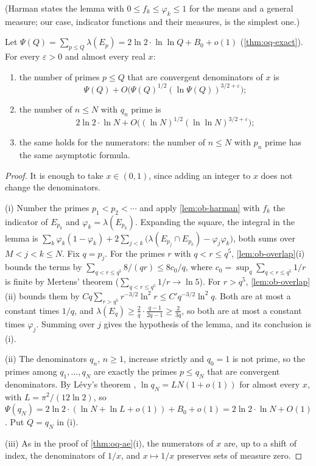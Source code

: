 (Harman states the lemma with $0 \le f_k \le \varphi_k \le 1$ for the means and a general measure; our case, indicator functions and their measures, is the simplest one.)

\begin{theorem}\label{thm:ob-ae}
Let $\Psi(Q) = \sum_{p \le Q}\lambda(E_p) = 2\ln 2\cdot\ln\ln Q + B_0 + o(1)$ (\cref{thm:oq-exact}). For every $\varepsilon > 0$ and almost every real $x$:
\begin{enumerate}[label=(\roman*)]
\item the number of primes $p \le Q$ that are convergent denominators of $x$ is
\[
  \Psi(Q) + O\bigl(\Psi(Q)^{1/2}(\ln\Psi(Q))^{3/2+\varepsilon}\bigr);
\]
\item the number of $n \le N$ with $q_n$ prime is
\[
  2\ln 2\cdot\ln N + O\bigl((\ln N)^{1/2}(\ln\ln N)^{3/2+\varepsilon}\bigr);
\]
\item the same holds for the numerators: the number of $n \le N$ with $p_n$ prime has the same asymptotic formula.
\end{enumerate}
\end{theorem}

\begin{proof}
It is enough to take $x \in (0,1)$, since adding an integer to $x$ does not change the denominators.

(i) Number the primes $p_1 < p_2 < \cdots$ and apply \cref{lem:ob-harman} with $f_k$ the indicator of $E_{p_k}$ and $\varphi_k = \lambda(E_{p_k})$. Expanding the square, the integral in the lemma is $\sum_k \varphi_k(1 - \varphi_k) + 2\sum_{j<k}\bigl(\lambda(E_{p_j}\cap E_{p_k}) - \varphi_j\varphi_k\bigr)$, both sums over $M < j < k \le N$. Fix $q = p_j$. For the primes $r$ with $q < r \le q^5$, \cref{lem:ob-overlap}(i) bounds the terms by $\sum_{q < r \le q^5} 8/(qr) \le 8c_0/q$, where $c_0 = \sup_q \sum_{q < r \le q^5} 1/r$ is finite by Mertens' theorem ($\sum_{q < r \le q^5} 1/r \to \ln 5$). For $r > q^5$, \cref{lem:ob-overlap}(ii) bounds them by $Cq\sum_{r > q^5} r^{-3/2}\ln^2 r \le C'q^{-3/2}\ln^2 q$. Both are at most a constant times $1/q$, and $\lambda(E_q) \ge \frac2q\cdot\frac{q-1}{2q-1} \ge \frac{2}{3q}$, so both are at most a constant times $\varphi_j$. Summing over $j$ gives the hypothesis of the lemma, and its conclusion is (i).

(ii) The denominators $q_n$, $n \ge 1$, increase strictly and $q_0 = 1$ is not prime, so the primes among $q_1, \dots, q_N$ are exactly the primes $p \le q_N$ that are convergent denominators. By Lévy's theorem \citep{Levy1936}, $\ln q_N = LN(1 + o(1))$ for almost every $x$, with $L = \pi^2/(12\ln 2)$, so $\Psi(q_N) = 2\ln 2\cdot(\ln N + \ln L + o(1)) + B_0 + o(1) = 2\ln 2\cdot\ln N + O(1)$. Put $Q = q_N$ in (i).

(iii) As in the proof of \cref{thm:oq-ae}(i), the numerators of $x$ are, up to a shift of index, the denominators of $1/x$, and $x \mapsto 1/x$ preserves sets of measure zero.
\end{proof}

